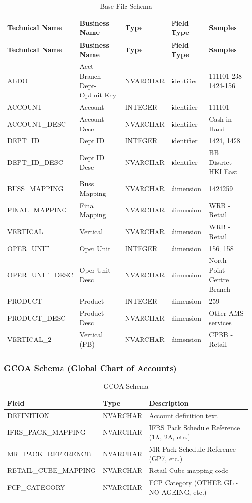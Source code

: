 \documentclass[11pt,a4paper]{article}
\begin{document}
\begin{longtable}{@{}L{3cm}L{3cm}C{2cm}C{1.5cm}L{4cm}@{}}
\caption{Base File Schema} \\
\toprule
\textbf{Technical Name} & \textbf{Business Name} & \textbf{Type} & \textbf{Field Type} & \textbf{Samples} \\
\midrule
\endfirsthead
\toprule
\textbf{Technical Name} & \textbf{Business Name} & \textbf{Type} & \textbf{Field Type} & \textbf{Samples} \\
\midrule
\endhead
ABDO & Acct-Branch-Dept-OpUnit Key & NVARCHAR & identifier & 111101-238-1424-156 \\
ACCOUNT & Account & INTEGER & identifier & 111101 \\
ACCOUNT\_DESC & Account Desc & NVARCHAR & identifier & Cash in Hand \\
DEPT\_ID & Dept ID & INTEGER & identifier & 1424, 1428 \\
DEPT\_ID\_DESC & Dept ID Desc & NVARCHAR & identifier & BB District-HKI East \\
BUSS\_MAPPING & Buss Mapping & NVARCHAR & dimension & 1424259 \\
FINAL\_MAPPING & Final Mapping & NVARCHAR & dimension & WRB - Retail \\
VERTICAL & Vertical & NVARCHAR & dimension & WRB - Retail \\
OPER\_UNIT & Oper Unit & INTEGER & dimension & 156, 158 \\
OPER\_UNIT\_DESC & Oper Unit Desc & NVARCHAR & dimension & North Point Centre Branch \\
PRODUCT & Product & INTEGER & dimension & 259 \\
PRODUCT\_DESC & Product Desc & NVARCHAR & dimension & Other AMS services \\
VERTICAL\_2 & Vertical (PB) & NVARCHAR & dimension & CPBB - Retail \\
\bottomrule
\end{longtable}

\subsubsection{GCOA Schema (Global Chart of Accounts)}

\begin{table}[h]
\centering
\caption{GCOA Schema}
\begin{tabular}{@{}L{4cm}C{2.5cm}L{7.5cm}@{}}
\toprule
\textbf{Field} & \textbf{Type} & \textbf{Description} \\
\midrule
DEFINITION & NVARCHAR & Account definition text \\
IFRS\_PACK\_MAPPING & NVARCHAR & IFRS Pack Schedule Reference (1A, 2A, etc.) \\
MR\_PACK\_REFERENCE & NVARCHAR & MR Pack Schedule Reference (GP7, etc.) \\
RETAIL\_CUBE\_MAPPING & NVARCHAR & Retail Cube mapping code \\
FCP\_CATEGORY & NVARCHAR & FCP Category (OTHER GL - NO AGEING, etc.) \\
\bottomrule
\end{tabular}
\end{table}
\end{document}
